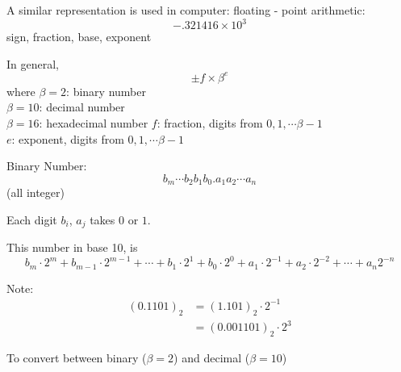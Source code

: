 \documentclass[10pt]{article}
\theoremstyle{definition}
\begin{document}
   A similar representation is used in computer: floating - point arithmetic:
   $$ - .321416 \times 10^3$$
   sign, fraction, base, exponent
   
   In general, $$\pm f \times \beta^e$$
   where $\beta =2$: binary number\\
   $\beta =10$: decimal number\\
   $\beta =16$: hexadecimal number
   $f$: fraction, digits from $0,1,\cdots \beta-1$\\
   $e$: exponent, digits from $0,1,\cdots \beta-1$
   
   Binary Number: 
   \[b_m \cdots b_2b_1b_0. a_1a_2\cdots a_n\](all integer)
   
   Each digit $b_i$, $a_j$ takes $0$ or $1$.
   
   This number in base 10, is $$b_m\cdot 2^m+b_{m-1}\cdot 2^{m-1}+\cdots + b_1\cdot 2^1+b_0\cdot 2^0 + a_1\cdot 2^{-1} +  a_2\cdot 2^{-2} + \cdots +a_n2^{-n}$$
   
   Note: \begin{align*}
   (0.1101)_2 &= (1.101)_2\cdot 2^{-1}\\
   &= (0.001101)_2\cdot 2^3
   \end{align*}
   
   To convert between binary ($\beta =2$) and decimal  ($\beta =10$)
   
\end{document}
